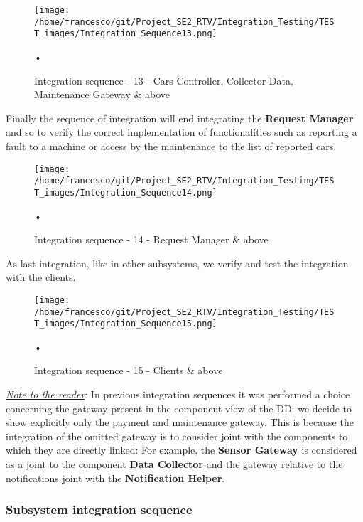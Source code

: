 \documentclass[10pt, a4paper,titlepage]{article}
\begin{document}
\begin{figure}[h]
\begin{center}
\texttt{[image: /home/francesco/git/Project\_SE2\_RTV/Integration\_Testing/TEST\_images/Integration\_Sequence13.png]}
\caption{Integration sequence - 13 - Cars Controller, Collector Data, Maintenance Gateway \& above}
\label{fig:int_seq13}
\end{center}•
\end{figure}
Finally the sequence of integration will end integrating the \textbf{Request Manager} and so to verify the correct implementation of functionalities such as reporting a fault to a machine or access by the maintenance to the list of reported cars.
\begin{figure}[h]
\begin{center}
\texttt{[image: /home/francesco/git/Project\_SE2\_RTV/Integration\_Testing/TEST\_images/Integration\_Sequence14.png]}
\caption{Integration sequence - 14 - Request Manager \& above}
\label{fig:int_seq14}
\end{center}•
\end{figure}
As last integration, like in other subsystems, we verify and test the integration with the clients.
\begin{figure}[h]
\begin{center}
\texttt{[image: /home/francesco/git/Project\_SE2\_RTV/Integration\_Testing/TEST\_images/Integration\_Sequence15.png]}
\caption{Integration sequence - 15 - Clients \& above}
\label{fig:int_seq15}
\end{center}•
\end{figure}
\clearpage
\emph{\underline{Note to the reader}}: In previous integration sequences it was performed a choice concerning the gateway present in the component view of the DD: we decide to show explicitly only the payment and maintenance gateway. This is because the integration of the omitted gateway is to consider joint with the components to which they are directly linked: For example, the \textbf{Sensor Gateway} is considered as a joint to the component \textbf{Data Collector} and the gateway relative to the notifications joint with the \textbf{Notification Helper}.
\pagebreak
\subsubsection{Subsystem integration sequence}
\end{document}
